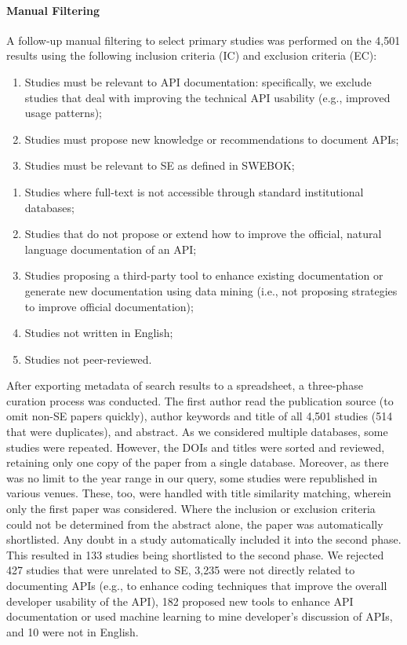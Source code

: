 \paragraph{Manual Filtering}

A follow-up manual filtering to select primary studies was performed on the 4,501 results using the following inclusion criteria (IC) and exclusion criteria (EC):

\begin{enumerate}[leftmargin=4\parindent,label=\textbf{IC\arabic*}]
  \item Studies must be relevant to API documentation: specifically, we exclude studies that deal with improving the technical API usability (e.g., improved usage patterns);
  \item Studies must propose new knowledge or recommendations to document APIs;
  \item Studies must be relevant to SE as defined in SWEBOK;
\end{enumerate}
\begin{enumerate}[leftmargin=4\parindent,label=\textbf{EC\arabic*}]
  \item Studies where full-text is not accessible through standard institutional databases; 
  \item Studies that do not propose or extend how to improve the official, natural language documentation of an API;
  \item Studies proposing a third-party tool to enhance existing documentation or generate new documentation using data mining (i.e., not proposing strategies to improve official documentation);
  \item Studies not written in English;
  \item Studies not peer-reviewed.
\end{enumerate}
\smallskip

After exporting metadata of search results to a spreadsheet, a three-phase curation process was conducted. The first author read the publication source (to omit non-SE papers quickly), author keywords and title of all 4,501 studies (514 that were duplicates), and abstract. As we considered multiple databases, some studies were repeated. However, the DOIs and titles were sorted and reviewed, retaining only one copy of the paper from a single database. Moreover, as there was no limit to the year range in our query, some studies were republished in various venues. These, too, were handled with title similarity matching, wherein only the first paper was considered. Where the inclusion or exclusion criteria could not be determined from the abstract alone, the paper was automatically shortlisted. Any doubt in a study automatically included it into the second phase. This resulted in 133 studies being shortlisted to the second phase. We rejected 427 studies that were unrelated to SE, 3,235 were not directly related to documenting APIs (e.g., to enhance coding techniques that improve the overall developer usability of the API), 182 proposed new tools to enhance API documentation or used machine learning to mine developer's discussion of APIs, and 10 were not in English.

